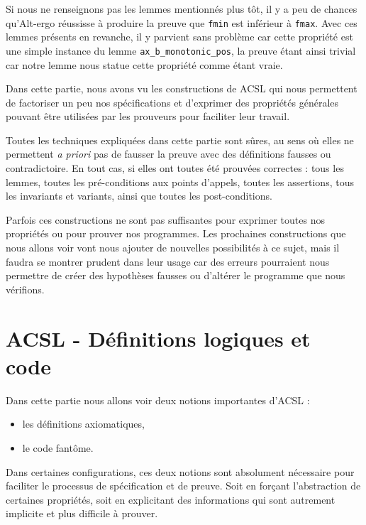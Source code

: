 \documentclass[12pt,francais,]{scrbook}
\providecommand{\tightlist}{%
  \setlength{\itemsep}{0pt}\setlength{\parskip}{0pt}}
\begin{document}
Si nous ne renseignons pas les lemmes mentionnés plus tôt, il y a peu de
chances qu'Alt-ergo réussisse à produire la preuve que \texttt{fmin} est
inférieur à \texttt{fmax}. Avec ces lemmes présents en revanche, il y
parvient sans problème car cette propriété est une simple instance du
lemme \texttt{ax\_b\_monotonic\_pos}, la preuve étant ainsi trivial car
notre lemme nous statue cette propriété comme étant vraie.

Dans cette partie, nous avons vu les constructions de ACSL qui nous
permettent de factoriser un peu nos spécifications et d'exprimer des
propriétés générales pouvant être utilisées par les prouveurs pour
faciliter leur travail.

Toutes les techniques expliquées dans cette partie sont sûres, au sens
où elles ne permettent \emph{a priori} pas de fausser la preuve avec des
définitions fausses ou contradictoire. En tout cas, si elles ont toutes
été prouvées correctes : tous les lemmes, toutes les pré-conditions aux
points d'appels, toutes les assertions, tous les invariants et variants,
ainsi que toutes les post-conditions.

Parfois ces constructions ne sont pas suffisantes pour exprimer toutes
nos propriétés ou pour prouver nos programmes. Les prochaines
constructions que nous allons voir vont nous ajouter de nouvelles
possibilités à ce sujet, mais il faudra se montrer prudent dans leur
usage car des erreurs pourraient nous permettre de créer des hypothèses
fausses ou d'altérer le programme que nous vérifions.

\chapter{ACSL - Définitions logiques et
code}\label{acsl---duxe9finitions-logiques-et-code}

Dans cette partie nous allons voir deux notions importantes d'ACSL :

\begin{itemize}
\tightlist
\item
  les définitions axiomatiques,
\item
  le code fantôme.
\end{itemize}

Dans certaines configurations, ces deux notions sont absolument
nécessaire pour faciliter le processus de spécification et de preuve.
Soit en forçant l'abstraction de certaines propriétés, soit en
explicitant des informations qui sont autrement implicite et plus
difficile à prouver.
\end{document}
